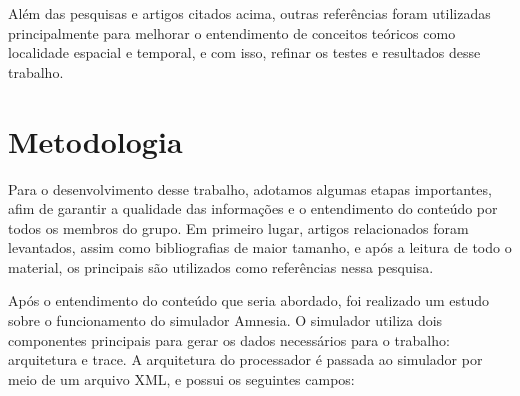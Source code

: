 \documentclass[conference]{IEEEtran}
\begin{document}
Além das pesquisas e artigos citados acima, outras referências foram utilizadas principalmente para melhorar o entendimento de conceitos teóricos como localidade espacial e temporal, e com isso, refinar os testes e resultados desse trabalho.

\section{Metodologia}
Para o desenvolvimento desse trabalho, adotamos algumas etapas importantes, afim de garantir a qualidade das informações e o entendimento do conteúdo por todos os membros do grupo. Em primeiro lugar, artigos relacionados foram levantados, assim como bibliografias de maior tamanho, e após a leitura de todo o material, os principais são utilizados como referências nessa pesquisa.

Após o entendimento do conteúdo que seria abordado, foi realizado um estudo sobre o funcionamento do simulador Amnesia. O simulador utiliza dois componentes principais para gerar os dados necessários para o trabalho: arquitetura e trace. A arquitetura do processador é passada ao simulador por meio de um arquivo XML, e possui os seguintes campos:
\end{document}
